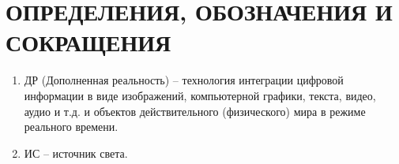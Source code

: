 \chapter*{ОПРЕДЕЛЕНИЯ, ОБОЗНАЧЕНИЯ И СОКРАЩЕНИЯ}

\begin{enumerate}
	\item ДР (Дополненная реальность) -- технология интеграции цифровой информации в виде изображений, компьютерной графики, текста, видео, аудио и т.д. и объектов действительного (физического) мира в режиме реального времени.
	\item ИС -- источник света.
\end{enumerate}